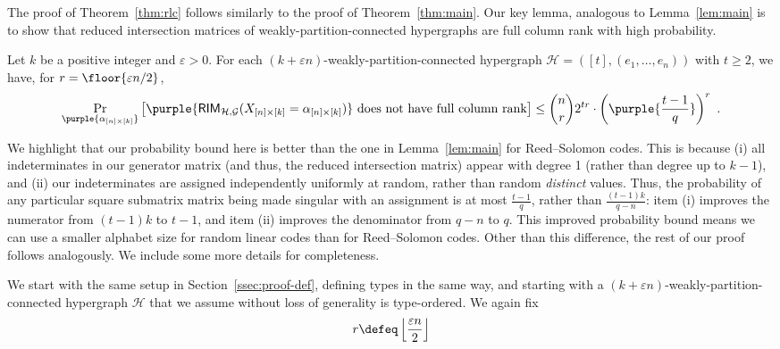 \documentclass{article}[11pt]
\begin{document}
The proof of Theorem~\ref{thm:rlc} follows similarly to the proof of Theorem~\ref{thm:main}.
Our key lemma, analogous to Lemma~\ref{lem:main} is to show that reduced intersection matrices of weakly-partition-connected hypergraphs are full column rank with high probability.
\begin{lemma}
  Let $k$ be a positive integer and $\varepsilon>0$.
  For each $(k+\varepsilon n)$-weakly-partition-connected hypergraph $\mathcal{H}=([t],(e_1,\dots,e_n))$ with $t \ge 2$, we have, for $r=\floor{\varepsilon n/2}$,
  \begin{align}
    \Pr_{\purple{\alpha_{[n]\times [k]}}} \left[ \purple{\mathsf{RIM}_{\mathcal{H},\mathcal{G}}(X_{[n]\times [k]}=\alpha_{[n]\times [k]})}\text{ does not have full column rank} \right] \le \binom{n}{r}2^{tr}\cdot \left(\purple{\frac{t-1}{q}}\right)^r \ .
    \label{}
  \end{align}
  \label{lem:rlc:main}
\end{lemma}
We highlight that our probability bound here is better than the one in Lemma~\ref{lem:main} for Reed--Solomon codes. This is because (i) all indeterminates in our generator matrix (and thus, the reduced intersection matrix) appear with degree 1 (rather than degree up to $k-1$), and (ii) our indeterminates are assigned independently uniformly at random, rather than random \emph{distinct} values.
Thus, the probability of any particular square submatrix matrix being made singular with an assignment is at most $\frac{t-1}{q}$, rather than $\frac{(t-1)k}{q-n}$: item (i) improves the numerator from $(t-1)k$ to $t-1$, and item (ii) improves the denominator from $q-n$ to $q$.
This improved probability bound means we can use a smaller alphabet size for random linear codes than for Reed--Solomon codes.
Other than this difference, the rest of our proof follows analogously. We include some more details for completeness.


We start with the same setup in Section~\ref{ssec:proof-def}, defining types in the same way, and starting with a $(k+\varepsilon n)$-weakly-partition-connected hypergraph $\mathcal{H}$ that we assume without loss of generality is type-ordered.
We again fix
\begin{align}
  r\defeq \left\lfloor \frac{\varepsilon n}{2} \right\rfloor
  \label{}
\end{align}
\end{document}
